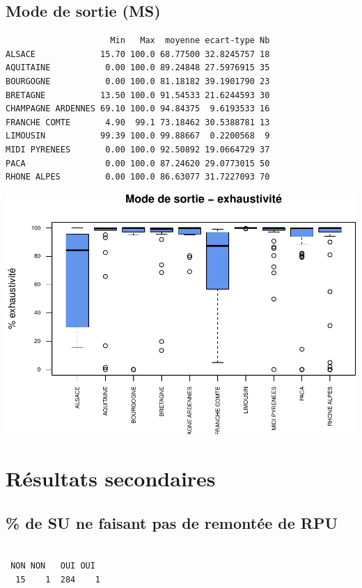 \documentclass[]{article}
\begin{document}
\subsection{Mode de sortie (MS)}\label{mode-de-sortie-ms-2}

\begin{verbatim}
                     Min   Max  moyenne ecart-type Nb
ALSACE             15.70 100.0 68.77500 32.8245757 18
AQUITAINE           0.00 100.0 89.24848 27.5976915 35
BOURGOGNE           0.00 100.0 81.18182 39.1901790 23
BRETAGNE           13.50 100.0 91.54533 21.6244593 30
CHAMPAGNE ARDENNES 69.10 100.0 94.84375  9.6193533 16
FRANCHE COMTE       4.90  99.1 73.18462 30.5388781 13
LIMOUSIN           99.39 100.0 99.88667  0.2200568  9
MIDI PYRENEES       0.00 100.0 92.50892 19.0664729 37
PACA                0.00 100.0 87.24620 29.0773015 50
RHONE ALPES         0.00 100.0 86.63077 31.7227093 70
\end{verbatim}

\includegraphics{septembre2015_files/figure-latex/unnamed-chunk-30-1.pdf}

\section{Résultats secondaires}\label{resultats-secondaires}

\subsection{\% de SU ne faisant pas de remontée de
RPU}\label{de-su-ne-faisant-pas-de-remontee-de-rpu}

\begin{verbatim}

 NON NON   OUI OUI  
  15    1  284    1 
\end{verbatim}
\end{document}
